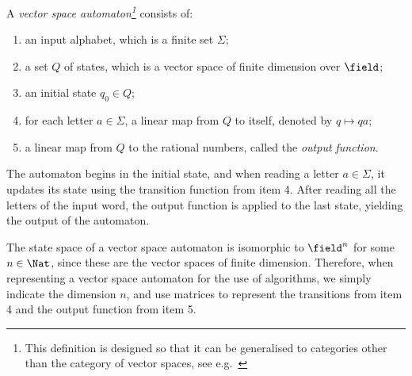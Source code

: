 \begin{definition}\label{def:vector-space-automaton} A  \emph{vector space automaton\footnote{This definition is designed so that it can be generalised to categories other than the category of vector spaces, see e.g.~\cite{Colcombet:2017is}}} consists of:
\begin{enumerate}
	\item an input alphabet, which is a finite set $\Sigma$;
	\item a set $Q$ of states, which is a vector space of finite dimension over $\field$;
	\item an initial state $q_0 \in Q$;
	\item for each letter $a \in \Sigma$, a linear map from $Q$ to itself, denoted by  $q \mapsto qa$;
	\item a linear map from $Q$ to the rational numbers, called the \emph{output function}.
\end{enumerate}
The automaton begins in the initial state, and when reading a letter $a \in \Sigma$, it updates its state using the transition function from item 4. After reading all the letters of the input word, the output function is applied to the last state, yielding the output of the automaton.
\end{definition}

The state space of a vector space automaton is  isomorphic to $\field^n$ for some $n \in \Nat$, since these are the vector spaces of finite dimension. Therefore, when representing a vector space automaton for the use of algorithms, we simply indicate the dimension $n$, and use matrices to represent the transitions from item 4 and the output function from item 5. 


